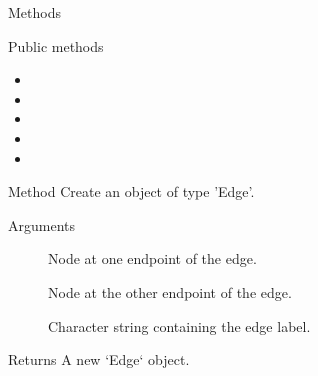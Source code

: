 \documentclass[a4paper]{book}
\begin{document}
%
\begin{Section}{Methods}
%
\begin{SubSection}{Public methods}
\begin{itemize}

\item{} 
\item{} 
\item{} 
\item{} 
\item{} 

\end{itemize}

\end{SubSection}



\hypertarget{method-new}{}
%
\begin{SubSection}{Method }
Create an object of type 'Edge'.
%


%
\begin{SubSubSection}{Arguments}

\begin{description}

\item[] Node at one endpoint of the edge.

\item[] Node at the other endpoint of the edge.

\item[] Character string containing the edge label.

\end{description}


\end{SubSubSection}

%
\begin{SubSubSection}{Returns}
A new `Edge` object.
\end{SubSubSection}

\end{SubSection}




\end{Section}
\end{document}
